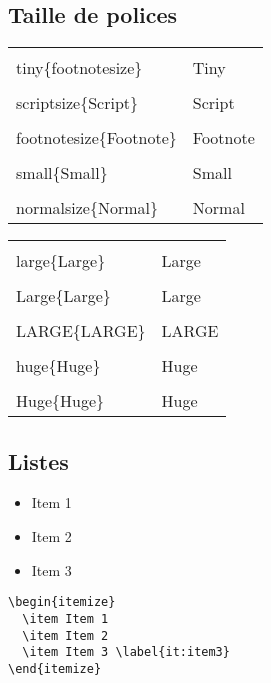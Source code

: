 \documentclass{article}
\begin{document}
\begin{multicols*}{3}
\subsection*{Taille de polices}
\begin{multicols*}{2}
  \begin{tabularx}{\columnwidth}{lX}
    \lstinline{\\tiny\{footnotesize\}} & \tiny{Tiny} \\
    \lstinline{\\scriptsize\{Script\}} & \scriptsize{Script} \\
    \lstinline{\\footnotesize\{Footnote\}} & \footnotesize{Footnote} \\
    \lstinline{\\small\{Small\}} & \small{Small} \\
    \lstinline{\\normalsize\{Normal\}} & \normalsize{Normal} \\
    \end{tabularx}
  \columnbreak
  \begin{tabularx}{\columnwidth}{lX}
    \lstinline{\\large\{Large\}} & \large{Large} \\
    \lstinline{\\Large\{Large\}} & \Large{Large} \\
    \lstinline{\\LARGE\{LARGE\}} & \LARGE{LARGE} \\
    \lstinline{\\huge\{Huge\}} & \huge{Huge} \\
    \lstinline{\\Huge\{Huge\}} & \Huge{Huge} \\
  \end{tabularx}
\end{multicols*}

\subsection*{Listes}
\begin{minipage}[c]{0.3\linewidth}
\begin{itemize}
  \item Item 1
  \item Item 2
  \item Item 3
\end{itemize}
\end{minipage}
\begin{minipage}[c]{0.6\linewidth}
\begin{lstlisting}
\begin{itemize}
  \item Item 1
  \item Item 2
  \item Item 3 \label{it:item3}
\end{itemize}
\end{lstlisting}
\end{minipage}


\end{multicols*}
\end{document}
